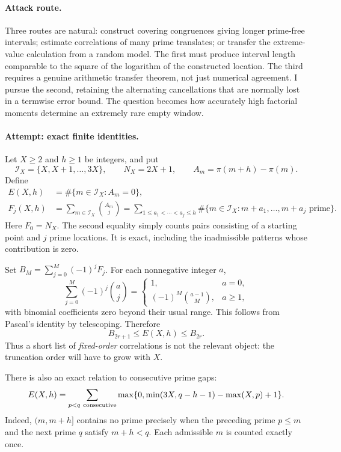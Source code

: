 \documentclass[11pt,a4paper]{article}
\numberwithin{equation}{section}
\begin{document}
\paragraph{Attack route.}
Three routes are natural: construct covering congruences giving longer
prime-free intervals; estimate correlations of many prime translates;
or transfer the extreme-value calculation from a random model. The first
must produce interval length comparable to the square of the logarithm
of the constructed location. The third requires a genuine arithmetic
transfer theorem, not just numerical agreement. I pursue the second,
retaining the alternating cancellations that are normally lost in a
termwise error bound. The question becomes how accurately high factorial
moments determine an extremely rare empty window.

\paragraph{Attempt: exact finite identities.}
Let $X\ge2$ and $h\ge1$ be integers, and put
\[
 \mathcal I_X=\{X,X+1,\ldots,3X\},\qquad N_X=2X+1,
 \qquad A_m=\pi(m+h)-\pi(m).
\]
Define
\begin{align}
 E(X,h)&=\#\{m\in\mathcal I_X:A_m=0\},\label{30006761:empty}\\
 F_j(X,h)&=\sum_{m\in\mathcal I_X}\binom{A_m}{j}
 =\sum_{1\le a_1<\cdots<a_j\le h}
   \#\{m\in\mathcal I_X:m+a_1,\ldots,m+a_j\text{ prime}\}.
 \label{30006761:factorial}
\end{align}
Here $F_0=N_X$. The second equality simply counts pairs consisting of a
starting point and $j$ prime locations. It is exact, including the
inadmissible patterns whose contribution is zero.

Set $B_M=\sum_{j=0}^M(-1)^jF_j$. For each nonnegative integer $a$,
\[
 \sum_{j=0}^M(-1)^j\binom aj=
 \begin{cases}
 1,&a=0,\\
 (-1)^M\binom{a-1}{M},&a\ge1,
 \end{cases}
\]
with binomial coefficients zero beyond their usual range. This follows
from Pascal's identity by telescoping. Therefore
\begin{equation}\label{30006761:bonferroni}
 B_{2r+1}\le E(X,h)\le B_{2r}.
\end{equation}
Thus a short list of \emph{fixed-order} correlations is not the relevant
object: the truncation order will have to grow with $X$.

There is also an exact relation to consecutive prime gaps:
\begin{equation}\label{30006761:gap-identity}
 E(X,h)=\sum_{p<q\ {\rm consecutive}}
 \max\{0,\min(3X,q-h-1)-\max(X,p)+1\}.
\end{equation}
Indeed, $(m,m+h]$ contains no prime precisely when the preceding prime
$p\le m$ and the next prime $q$ satisfy $m+h<q$. Each admissible $m$ is
counted exactly once.
\end{document}
